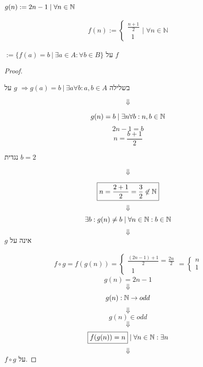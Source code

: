 \documentclass{article}
\begin{document}
\begin{remark}
    $ g(n) := 2n - 1 \; | \; \forall n \in \Bbb{N} $
\end{remark}

\begin{remark}
    \begin{align*}
        f(n) :=
        \begin{cases}
            \frac{n+1}{2} \\
            \; \; 1
        \end{cases}
        \Bigg | \; \forall n \in \mathbb{N}
    \end{align*}
\end{remark}

\begin{define}
    $ := \{ f(a) = b \: | \: \exists a \in A : \forall b \in B \} $
    על $f$
\end{define}

\begin{proof}
    
    \begin{ass}
        בשלילה
        $ \Rightarrow g(a) = b \: | \: \exists a \forall b : a, b \in A $
        $g$ על
    \end{ass}
    
    \[\Downarrow\]
    
    \[
        g(n) = b \; | \; \exists n \forall b : n, b \in \Bbb{N}
    \]
    \[
        2n - 1 = b
    \]
    \[
        n = \frac{b+1}{2}
    \]
    
    \begin{ex}
        נגדית
        $ b=2 $
    \end{ex}
    
    \[\Downarrow\]
    
    \[
        \boxed{ n = \frac{2+1}{2} = \frac{3}{2} \not \in \Bbb{N} }
    \]
    \[\Downarrow\]
    \[
        \exists b : g(n) \not = b \; | \; \forall n \in \Bbb{N} : b \in \Bbb{N}
    \]
    \[\Downarrow\]
    $ g $ אינה על \square

    \begin{align*}
        f \circ g = f(g(n)) = 
        \begin{cases}
            \frac{(2n - 1) + 1}{2} = \frac{2n}{2} \\
            \; \; 1
        \end{cases}
        =
        \begin{cases}
            n \\
            1
        \end{cases}
    \end{align*}
    \[
        g(n) = 2n - 1
    \]
    \[\Downarrow\]
    \[
        g(n) : \Bbb{N} \rightarrow odd
    \]
    \[\Downarrow\]
    \[
        g(n) \in odd
    \]
    \[\Downarrow\]
    \[
        \boxed{ f(g(n)) = n } \; | \; \forall n \in \Bbb{N} : \exists n
    \]
    \[\Downarrow\]
    $f \circ g$ על. \square

\end{proof}
\end{document}
